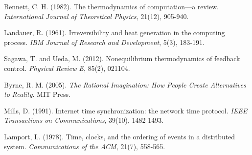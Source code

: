 \documentclass[12pt,a4paper]{article}
\begin{document}

\begin{thebibliography}{99}

Bennett, C. H. (1982). The thermodynamics of computation—a review. \textit{International Journal of Theoretical Physics}, 21(12), 905-940.

Landauer, R. (1961). Irreversibility and heat generation in the computing process. \textit{IBM Journal of Research and Development}, 5(3), 183-191.

Sagawa, T. and Ueda, M. (2012). Nonequilibrium thermodynamics of feedback control. \textit{Physical Review E}, 85(2), 021104.

Byrne, R. M. (2005). \textit{The Rational Imagination: How People Create Alternatives to Reality}. MIT Press.

Mills, D. (1991). Internet time synchronization: the network time protocol. \textit{IEEE Transactions on Communications}, 39(10), 1482-1493.

Lamport, L. (1978). Time, clocks, and the ordering of events in a distributed system. \textit{Communications of the ACM}, 21(7), 558-565.

\end{thebibliography}
\end{document}
